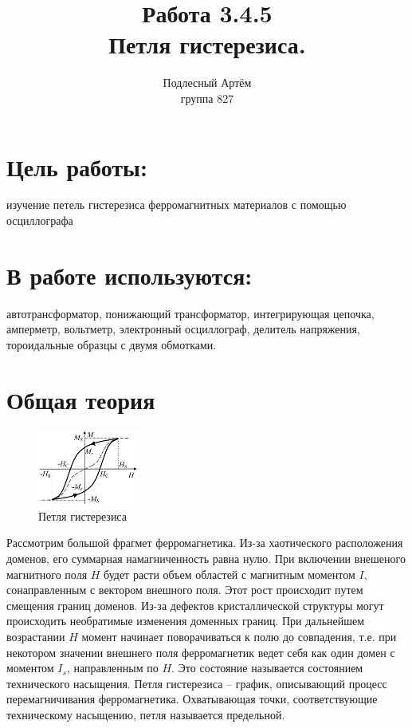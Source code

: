 \documentclass[a4paper]{article}%
\author{Подлесный Артём \\ группа 827}
\title{Работа 3.4.5 \\ Петля гистерезиса.}
\begin{document}
\maketitle
\section*{Цель работы:} изучение петель гистерезиса ферромагнитных материалов с помощью осциллографа

\section*{В работе используются:} автотрансформатор, понижающий трансформатор, интегрирующая цепочка, амперметр, вольтметр, электронный осциллограф, делитель напряжения, тороидальные образцы с двумя обмотками.

\section*{Общая теория}

\begin{figure}
	\vspace{-20pt}
	\begin{center}
		\includegraphics[width=0.3\textwidth]{petl}
	\end{center}
	\vspace{-20pt}
	\caption{Петля гистерезиса}
	\vspace{-10pt}
\end{figure} 
Рассмотрим большой фрагмет ферромагнетика. Из-за хаотического расположения доменов, его суммарная намагниченность равна нулю. При включении внешеного магнитного поля \textbf{$H$} будет расти объем областей с магнитным моментом \textbf{$I$}, сонаправленным с вектором внешного поля. Этот рост происходит путем смещения границ доменов. Из-за дефектов кристаллической структуры могут происходить необратимые изменения доменных границ. При дальнейшем возрастании  \textbf{$H$}  момент начинает поворачиваться к полю до совпадения, т.е. при некотором значении внешнего поля ферромагнетик ведет себя как один домен с моментом \textbf{$I_{s}$}, направленным по \textbf{$H$}. Это состояние называется состоянием технического насыщения. Петля гистерезиса -- график, описывающий процесс перемагничивания ферромагнетика. Охватывающая точки, соответствующие техническому насыщению, петля называется предельной. 
\end{document}
